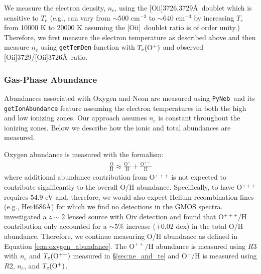 \documentclass[twocolumn,tight,times,linenumbers]{aastex631}
\newcommand{\oii}{[O{\sc ii}]}
\newcommand{\pyneb}{\texttt{PyNeb}}
\begin{document}
		We measure the electron density, $n_e$, using the \oii3726,3729\AA~doublet which is sensitive to $T_e$ (e.g., can vary from $\sim 500$ cm$^{-3}$ to $\sim 640$ cm$^{-3}$ by increasing $T_e$ from 10000 K to 20000 K assuming the \oii~doublet ratio is of order unity.) Therefore, we first measure the electron temperature as described above and then measure $n_e$ using \texttt{getTemDen} function with  $T_e(\rm{O}^{+})$ and observed \oii3729/\oii3726\AA~ratio.

		
		\subsubsection{Gas-Phase Abundance}
		\label{sec:abundances}
		Abundances associated with Oxygen and Neon are measured using \pyneb~and its \texttt{getIonAbundance} feature assuming the electron temperatures in both the high and low ionizing zones. Our approach assumes $n_e$ is constant throughout the ionizing zones. Below we describe how the ionic and total abundances are measured.
		
		Oxygen abundance is measured with the formalism:
		\begin{eqnarray}
			\frac{\textrm{O}}{\textrm{H}} \approx \frac{\textrm{O}^+}{\textrm{H}}  + \frac{\textrm{O}^{++}}{\textrm{H}} 
			\label{eqn:oxygen_abundance}
		\end{eqnarray}
		where additional abundance contribution from O$^{+++}$ is not expected to contribute significantly to the overall O/H abundance. Specifically, to have O$^{+++}$ requires $54.9$ eV and, therefore, we would also expect Helium recombination lines (e.g., He{\sc i}4686\AA) for which we find no detections in the GMOS spectra. \cite{Berg2018} investigated a $z \sim 2$ lensed source with O{\sc iv} detection and found that O$^{+++}/$H contribution only accounted for a $\sim 5$\% increase ($+0.02$ dex) in the total O/H abundance. Therefore, we continue measuring O/H abundance as defined in Equation \ref{eqn:oxygen_abundance}. The $\textrm{O}^{++}/\textrm{H}$ abundance is measured using $R3$ with $n_e$ and $T_e(\rm{O}^{++})$ measured in \S\ref{sec:ne_and_te} and $\textrm{O}^{+}/\textrm{H}$ is measured using $R2$, $n_e$, and $T_e(\rm{O}^{+})$. %
\end{document}
